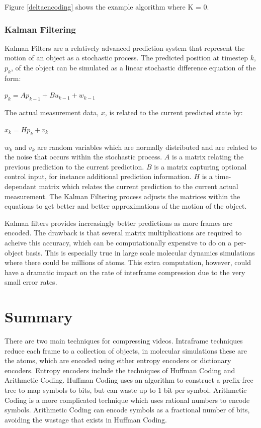 \documentclass[a4paper,11pt]{report}
\begin{document}
Figure \ref{deltaencoding} shows the example algorithm where K = 0.
 
\subsubsection{Kalman Filtering}

Kalman Filters are a relatively advanced prediction system that represent the motion of an object as a stochastic process.\cite{welch1995ikf} The predicted position at timestep $k$, $p_k$, of the object can be simulated as a linear stochastic difference equation of the form:
\begin{center} $p_k = Ap_{k-1} + Bu_{k-1} + w_{k-1}$  \end{center}
The actual measurement data, $x$, is related to the current predicted state by:
\begin{center} $x_k = Hp_k + v_k$ \end{center}
$w_k$ and $v_k$ are random variables which are normally distributed and are related to the noise that occurs within the stochastic process. $A$ is a matrix relating the previous prediction to the current prediction. $B$ is a matrix capturing optional control input, for instance additional prediction information. $H$ is a time-dependant matrix which relates the current prediction to the current actual measurement. The Kalman Filtering process adjusts the matrices within the equations to get better and better approximations of the motion of the object.

Kalman filters provides increasingly better predictions as more frames are encoded. The drawback is that several matrix multiplications are required to acheive this accuracy, which can be computationally expensive to do on a per-object basis. This is especially true in large scale molecular dynamics simulations where there could be millions of atoms. This extra computation, however, could have a dramatic impact on the rate of interframe compression due to the very small error rates.

\section{Summary}

There are two main techniques for compressing videos. Intraframe techniques reduce each frame to a collection of objects, in molecular simulations these are the atoms, which are encoded using either entropy encoders or dictionary encoders. Entropy encoders include the techniques of Huffman Coding and Arithmetic Coding. Huffman Coding uses an algorithm to construct a prefix-free tree to map symbols to bits, but can waste up to $1$ bit per symbol. Arithmetic Coding is a more complicated technique which uses rational numbers to encode symbols. Arithmetic Coding can encode symbols as a fractional number of bits, avoiding the wastage that exists in Huffman Coding.
\end{document}
